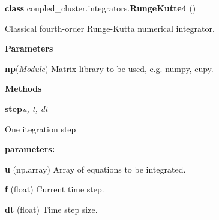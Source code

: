 \begin{tcolorbox}
    {\selectfont
    \textbf{class} coupled\_cluster.integrators.\textbf{RungeKutte4}
    ()

    \vspace{1em}
    Classical fourth-order Runge-Kutta numerical integrator.

    \vspace{1em}
    \textbf{Parameters}

    \hspace{2em}\textbf{np}(\emph{Module})
        Matrix library to be used, e.g. numpy, cupy.

    \vspace{1em} 
    \textbf{Methods}

    \hspace{2em} \textbf{step}{\emph{u, t, dt}}

        \begin{adjustwidth}{4em}{}
        One itegration step

        \textbf{parameters:} 
        
            \hspace{1.5em} \textbf{u} (np.array) Array of equations to be integrated.

            \hspace{1.5em} \textbf{f} (float) Current time step.

            \hspace{1.5em} \textbf{dt} (float) Time step size.

        \end{adjustwidth}



    } 
\end{tcolorbox}